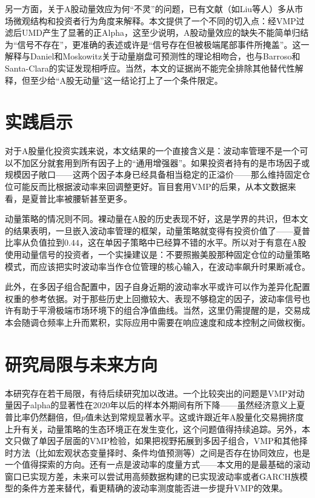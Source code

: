 \documentclass[
    decl-page,
    oneside,
  ]{njuthesis}
\begin{document}
另一方面，关于A股动量效应为何“不灵”的问题，已有文献（如Liu等人\cite{liu2019size}）多从市场微观结构和投资者行为角度来解释。本文提供了一个不同的切入点：经VMP过滤后UMD产生了显著的正Alpha，这至少说明，A股动量效应的缺失不能简单归结为“信号不存在”，更准确的表述或许是“信号存在但被极端尾部事件所掩盖”。这一解释与Daniel和Moskowitz\cite{daniel2016momentum}关于动量崩盘可预测性的理论相吻合，也与Barroso和Santa-Clara\cite{barroso2015momentum}的实证发现相呼应。当然，本文的证据尚不能完全排除其他替代性解释，但至少给“A股无动量”这一结论打上了一个条件限定。

\section{实践启示}

对于A股量化投资实践来说，本文结果的一个直接含义是：波动率管理不是一个可以不加区分就套用到所有因子上的“通用增强器”。如果投资者持有的是市场因子或规模因子敞口——这两个因子本身已经具备相当稳定的正溢价——那么维持固定仓位可能反而比根据波动率来回调整更好。盲目套用VMP的后果，从本文数据来看，是夏普比率被腰斩甚至更多。

动量策略的情况则不同。裸动量在A股的历史表现不好，这是学界的共识，但本文的结果表明，一旦嵌入波动率管理的框架，动量策略就变得有投资价值了——夏普比率从负值拉到$0.44$，这在单因子策略中已经算不错的水平。所以对于有意在A股使用动量信号的投资者，一个实操建议是：不要照搬美股那种固定仓位的动量策略模式，而应该把实时波动率当作仓位管理的核心输入，在波动率飙升时果断减仓。

此外，在多因子组合配置中，因子自身近期的波动率水平或许可以作为差异化配置权重的参考依据。对于那些历史上回撤较大、表现不够稳定的因子，波动率信号也许有助于平滑极端市场环境下的组合净值曲线。当然，这里仍需提醒的是，交易成本会随调仓频率上升而累积，实际应用中需要在响应速度和成本控制之间做权衡。

\section{研究局限与未来方向}
本研究存在若干局限，有待后续研究加以改进。一个比较突出的问题是VMP对动量因子alpha的显著性在2020年以后的样本外期间有所下降——虽然经济意义上夏普比率仍然翻倍，但$p$值未达到常规显著水平。这或许跟近年A股量化交易拥挤度上升有关，动量策略的生态环境正在发生变化，这个问题值得持续追踪。另外，本文只做了单因子层面的VMP检验，如果把视野拓展到多因子组合，VMP和其他择时方法（比如宏观状态变量择时、条件均值预测等）之间是否存在协同效应，也是一个值得探索的方向。还有一点是波动率的度量方式——本文用的是最基础的滚动窗口已实现方差，未来可以尝试用高频数据构建的已实现波动率或者GARCH族模型的条件方差来替代，看更精确的波动率测度能否进一步提升VMP的效果。
\end{document}

